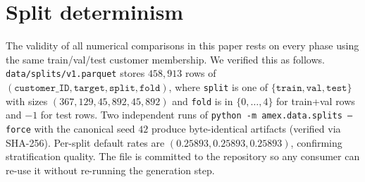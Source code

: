 \documentclass[sigconf, anonymous, review]{acmart}
\begin{document}
\section{Split determinism}
\label{app:split}

The validity of all numerical comparisons in this paper rests on
every phase using the same train/val/test customer membership. We
verified this as follows. \texttt{data/splits/v1.parquet} stores
$458{,}913$ rows of $(\texttt{customer\_ID}, \texttt{target},
\texttt{split}, \texttt{fold})$, where \texttt{split} is one of
$\{\texttt{train}, \texttt{val}, \texttt{test}\}$ with sizes
$(367{,}129, 45{,}892, 45{,}892)$ and \texttt{fold} is in
$\{0, \ldots, 4\}$ for train+val rows and $-1$ for test rows. Two
independent runs of \texttt{python -m amex.data.splits --force} with
the canonical seed $42$ produce byte-identical artifacts (verified
via SHA-256). Per-split default rates are
$(0.25893, 0.25893, 0.25893)$, confirming stratification quality.
The file is committed to the repository so any consumer can re-use
it without re-running the generation step.
\end{document}
